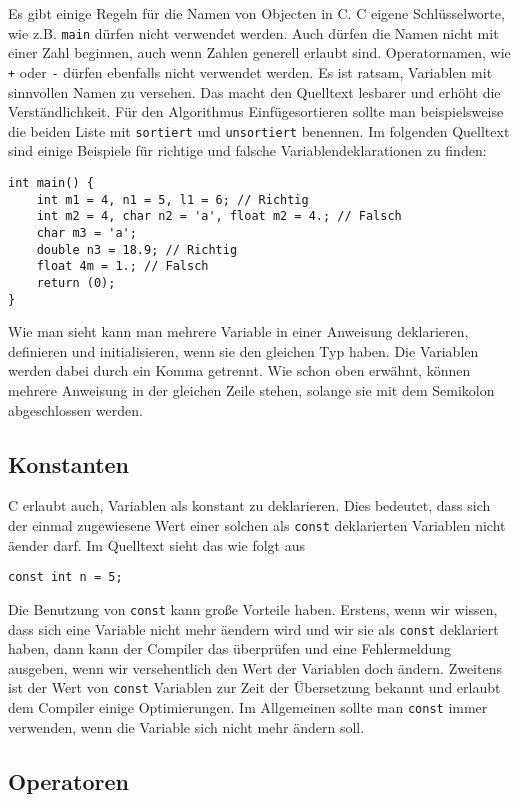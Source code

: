 Es gibt einige Regeln für die Namen von Objecten in C. 
C eigene Schlüsselworte, wie z.B. \texttt{main} dürfen nicht verwendet werden.
Auch dürfen die Namen nicht mit einer Zahl beginnen, auch wenn Zahlen generell erlaubt sind.
Operatornamen, wie \verb|+| oder \verb|-| dürfen ebenfalls nicht verwendet werden.
Es ist ratsam, Variablen mit sinnvollen Namen zu versehen.
Das macht den Quelltext lesbarer und erhöht die Verständlichkeit.
Für den Algorithmus Einfügesortieren sollte man beispielsweise die beiden Liste mit \texttt{sortiert} und \texttt{unsortiert} benennen.
Im folgenden Quelltext sind einige Beispiele für richtige und falsche Variablendeklarationen zu finden:
\begin{lstlisting}
int main() {
    int m1 = 4, n1 = 5, l1 = 6; // Richtig
    int m2 = 4, char n2 = 'a', float m2 = 4.; // Falsch
    char m3 = 'a';
    double n3 = 18.9; // Richtig
    float 4m = 1.; // Falsch
    return (0);
}
\end{lstlisting} 
Wie man sieht kann man mehrere Variable in einer Anweisung deklarieren, definieren und initialisieren, wenn sie den gleichen Typ haben.
Die Variablen werden dabei durch ein Komma getrennt.
Wie schon oben erwähnt, können mehrere Anweisung in der gleichen Zeile stehen, solange sie mit dem Semikolon abgeschlossen werden.

\subsection{Konstanten}

C erlaubt auch, Variablen als konstant zu deklarieren. 
Dies bedeutet, dass sich der einmal zugewiesene Wert einer solchen als \verb|const| deklarierten Variablen nicht äender darf.
Im Quelltext sieht das wie folgt aus
\begin{lstlisting}
const int n = 5;
\end{lstlisting}
Die Benutzung von \verb|const| kann große Vorteile haben.
Erstens, wenn wir wissen, dass sich eine Variable nicht mehr äendern wird und wir sie als  \verb|const| deklariert haben, dann kann der Compiler das überprüfen und eine Fehlermeldung ausgeben, wenn wir versehentlich den Wert der Variablen doch ändern.
Zweitens ist der Wert von \verb|const| Variablen zur Zeit der Übersetzung bekannt und erlaubt dem Compiler einige Optimierungen.
Im Allgemeinen sollte man \verb|const| immer verwenden, wenn die Variable sich nicht mehr ändern soll.

\subsection{Operatoren}

